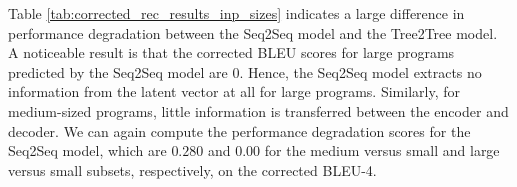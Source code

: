 \begin{table}[ht!]
\centering
\begingroup
\setlength{\tabcolsep}{3pt} %
\renewcommand{\arraystretch}{1.4} %
\endgroup
\caption{Corrected BLEU scores of reconstructed results of the best models on different input sizes. (correction scores in parenthesis)}
\label{tab:corrected_rec_results_inp_sizes}
\end{table}



Table \ref{tab:corrected_rec_results_inp_sizes} indicates a large difference in performance degradation between the Seq2Seq model and the Tree2Tree model. A noticeable result is that the corrected BLEU scores for large programs predicted by the Seq2Seq model are 0. Hence, the Seq2Seq model extracts no information from the latent vector at all for large programs. Similarly, for medium-sized programs, little information is transferred between the encoder and decoder. We can again compute the performance degradation scores for the Seq2Seq model, which are $0.280$ and $0.00$ for the medium versus small and large versus small subsets, respectively, on the corrected BLEU-4.



